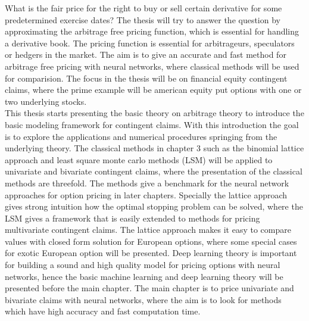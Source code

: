 What is the fair price for the right to buy or sell certain derivative for some predetermined exercise dates? The thesis will try to answer the question by approximating the arbitrage free pricing function, which is essential for handling a derivative book. The pricing function is essential for arbitrageurs, speculators or hedgers in the market. The aim is to give an accurate and fast method for arbitrage free pricing with neural networks, where classical methods will be used for comparision. The focus in the thesis will be on financial equity contingent claims, where the prime example will be american equity put options with one or two underlying stocks.\\

This thesis starts presenting the basic theory on arbitrage theory to introduce the basic modeling framework for contingent claims. With this introduction the goal is to explore the applications and numerical procedures springing from the underlying theory. The classical methods in chapter 3 such as the binomial lattice approach and least square monte carlo methods (LSM) will be applied to univariate and bivariate contingent claims, where the presentation of the classical methods are threefold. The methods give a benchmark for the neural network approaches for option pricing in later chapters. Specially the lattice approach gives strong intuition how the optimal stopping problem can be solved, where the LSM gives a framework that is easily extended to methods for pricing multivariate contingent claims. The lattice approach makes it easy to compare values with closed form solution for European options, where some special cases for exotic European option will be presented. Deep learning theory is important for building a sound and high quality model for pricing options with neural networks, hence the basic machine learning and deep learning theory will be presented before the main chapter. The main chapter is to price univariate and bivariate claims with neural networks, where the aim is to look for methods which have high accuracy and fast computation time. 


